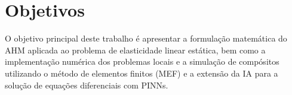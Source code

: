 \section{Objetivos}
O objetivo principal deste trabalho é apresentar a formulação matemática do AHM aplicada ao problema de elasticidade linear estática, bem como a implementação numérica dos problemas locais e a simulação de compósitos utilizando o método de elementos finitos (MEF) e a extensão da IA para a solução de equações diferenciais com PINNs.